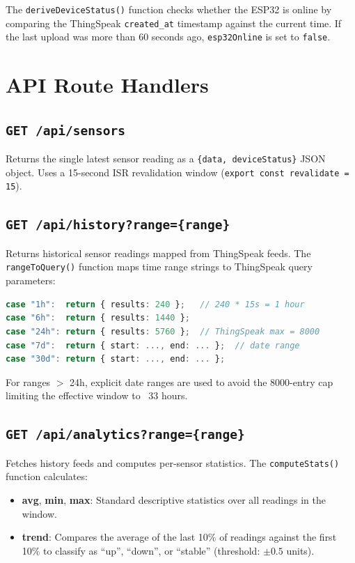 The \texttt{deriveDeviceStatus()} function checks whether the ESP32 is online by comparing the ThingSpeak \texttt{created\_\allowbreak{}at} timestamp against the current time. If the last upload was more than 60 seconds ago, \texttt{esp32Online} is set to \texttt{false}.

\section{API Route Handlers}

\subsection{\texttt{GET /\allowbreak{}api/\allowbreak{}sensors}}

Returns the single latest sensor reading as a \texttt{\{data,\allowbreak{} deviceStatus\}} JSON object. Uses a 15-second ISR revalidation window (\texttt{export const revalidate = 15}).

\subsection{\texttt{GET /\allowbreak{}api/\allowbreak{}history?range=\{range\}}}

Returns historical sensor readings mapped from ThingSpeak feeds. The \texttt{rangeToQuery()} function maps time range strings to ThingSpeak query parameters:

\begin{lstlisting}[language=TypeScript,caption={History range-to-query mapping}]
case "1h":  return { results: 240 };   // 240 * 15s = 1 hour
case "6h":  return { results: 1440 };
case "24h": return { results: 5760 };  // ThingSpeak max = 8000
case "7d":  return { start: ..., end: ... };  // date range
case "30d": return { start: ..., end: ... };
\end{lstlisting}

For ranges $>$ 24h, explicit date ranges are used to avoid the 8000-entry cap limiting the effective window to ~33 hours.

\subsection{\texttt{GET /\allowbreak{}api/\allowbreak{}analytics?range=\{range\}}}

Fetches history feeds and computes per-sensor statistics. The \texttt{computeStats()} function calculates:
\begin{itemize}[leftmargin=1.5em]
  \item \textbf{avg}, \textbf{min}, \textbf{max}: Standard descriptive statistics over all readings in the window.
  \item \textbf{trend}: Compares the average of the last 10\% of readings against the first 10\% to classify as ``up'', ``down'', or ``stable'' (threshold: $\pm 0.5$ units).
\end{itemize}

